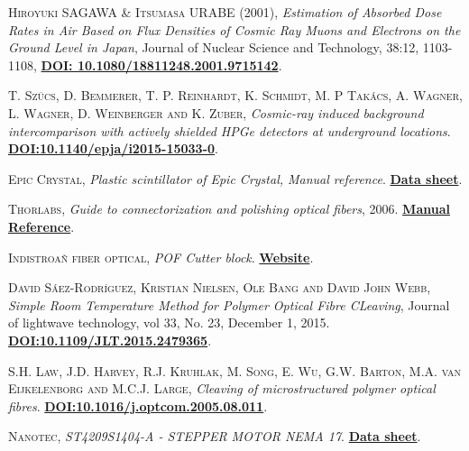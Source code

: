 \begin{thebibliography}{100}
 \textsc{Hiroyuki SAGAWA \& Itsumasa URABE (2001)},
\textit{Estimation of Absorbed Dose Rates in Air Based on Flux Densities of Cosmic Ray Muons and Electrons on the Ground Level in Japan}, Journal of Nuclear Science and Technology, 38:12, 1103-1108, \href{https://doi.org/10.1080/18811248.2001.9715142}{\textbf{DOI: 10.1080/18811248.2001.9715142}}.

 \textsc{T. Szücs, D. Bemmerer, T. P. Reinhardt, K. Schmidt, M. P Takács, A. Wagner, L. Wagner, D. Weinberger and K. Zuber},
\textit{Cosmic-ray induced background intercomparison with actively shielded HPGe detectors at underground locations}. \href{https://arxiv.org/abs/1503.00457v2}{\textbf{DOI:10.1140/epja/i2015-15033-0}}.

 \textsc{Epic Crystal},
\textit{Plastic scintillator of Epic Crystal, Manual reference}. \href{http://www.epic-crystal.com/others/plastic-scintillator.html}{\textbf{Data sheet}}.

 \textsc{Thorlabs},
\textit{Guide to connectorization and polishing optical fibers}, 2006. \href{https://www.thorlabs.de/thorproduct.cfm?partnumber=FN96A}{\textbf{Manual Reference}}.

 \textsc{Indistroañ fiber optical},
\textit{POF Cutter block}. \href{https://i-fiberoptics.com/tool-detail.php?id=105&cat=cutters}{\textbf{Website}}.

 \textsc{David Sáez-Rodríguez, Kristian Nielsen, Ole Bang and David John Webb},
\textit{Simple Room Temperature Method for Polymer Optical Fibre CLeaving}, Journal of lightwave technology, vol 33, No. 23, December 1, 2015. \href{https://ieeexplore.ieee.org/document/7274313}{\textbf{DOI:10.1109/JLT.2015.2479365}}.

 \textsc{S.H. Law, J.D. Harvey, R.J. Kruhlak, M. Song, E. Wu, G.W. Barton, M.A. van Eijkelenborg and M.C.J. Large},
\textit{Cleaving of microstructured polymer optical fibres}. \href{https://www.researchgate.net/publication/228880071_Cleaving_of_microstructured_polymer_optical_fibres}{\textbf{DOI:10.1016/j.optcom.2005.08.011}}.

 \textsc{Nanotec},
\textit{ST4209S1404-A - STEPPER MOTOR NEMA 17}. \href{https://en.nanotec.com/products/463-st4209s1404-a}{\textbf{Data sheet}}.


\end{thebibliography}
